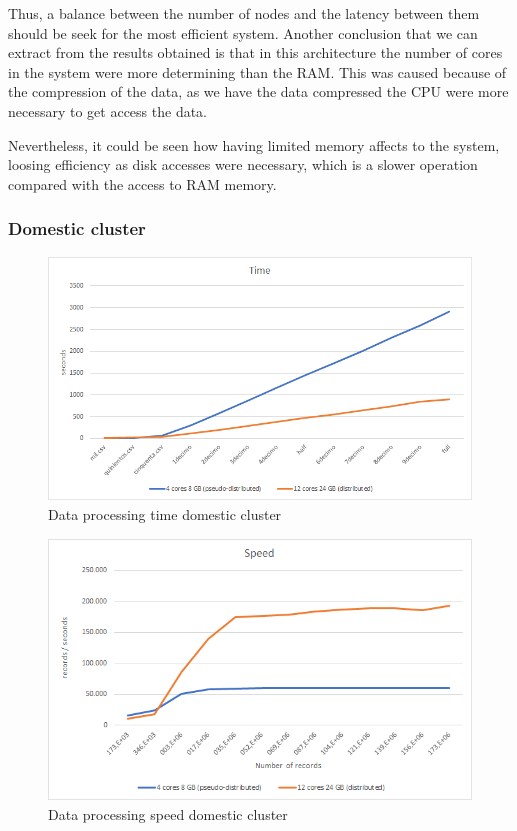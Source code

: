 Thus, a balance between the number of nodes and the latency between them should be seek for the most efficient system. Another conclusion that we can extract from the results obtained is that in this architecture the number of cores in the system were more determining than the \gls{RAM}. This was caused because of the compression of the data, as we have the data compressed the \gls{CPU} were more necessary to get access the data. 

Nevertheless, it could be seen how having limited memory affects to the system, loosing efficiency as disk accesses were necessary, which is a slower operation compared with the access to \gls{RAM} memory.


\subsubsection{Domestic cluster}
\begin{figure}[htp!]
	\centering
	\caption{Data processing time domestic cluster}
	\label{tpd}
	\vspace{5pt}
	\includegraphics[scale=0.8]{geng/tpd}
\end{figure}
\begin{figure}[htp!]
	\centering
	\caption{Data processing speed domestic cluster}
	\label{spd}
	\vspace{5pt}
	\includegraphics[scale=0.85]{geng/spd}
\end{figure}
